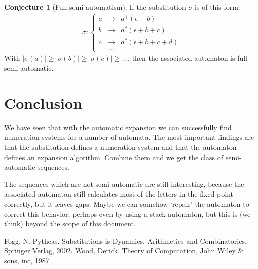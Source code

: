 \documentclass{article}
\theoremstyle{definition}
\newtheorem{conjecture}[theorem]{Conjecture}
\begin{document}
\begin{conjecture}[Full-semi-automatism]
If the substitution $\sigma$ is of this form:
\begin{eqnarray*}
\sigma: \left\{ \begin{array}{lll}
a &\rightarrow& a^+ (\epsilon + b)\\
b &\rightarrow& a^* (\epsilon + b + c)\\
c &\rightarrow& a^* (\epsilon + b + c + d)\\
  &\ldots     &
\end{array} \right.
\end{eqnarray*}
With $|\sigma(a)| \ge |\sigma(b)| \ge |\sigma(c)| \ge \ldots$, then the 
associated automaton is full-semi-automatic.
\end{conjecture}

\section{Conclusion}
We have seen that with the automatic expansion we can successfully find 
numeration systems for a number of automata. The most important findings are
that the substitution defines a numeration system and that the automaton 
defines an expansion algorithm. Combine them and we get the class of 
semi-automatic sequences.

The sequences which are not semi-automatic are still interesting, because
the associated automaton still calculates most of the letters in the fixed
point correctly, but it leaves gaps.
Maybe we can somehow `repair' the automaton to correct this behavior, 
perhaps even by using a stack automaton, but this is (we think) beyond the
scope of this document.

\begin{thebibliography}{XX}
 Fogg, N. Pytheas. Substitutions is Dynamics, Arithmetics and
               Combinatorics, Springer Verlag, 2002.
 Wood, Derick. Theory of Computation, John Wiley \& sons, inc, 
               1987
\end{thebibliography}
\end{document}
